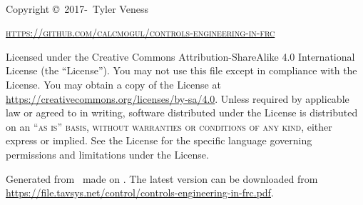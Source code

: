 ~\vfill
\thispagestyle{empty}

Copyright \copyright\ 2017-\unskip~Tyler Veness

\textsc{\url{https://github.com/calcmogul/controls-engineering-in-frc}}

Licensed under the Creative Commons Attribution-ShareAlike 4.0 International
License (the ``License''). You may not use this file except in compliance with
the License. You may obtain a copy of the License at
\url{https://creativecommons.org/licenses/by-sa/4.0}. Unless required by
applicable law or agreed to in writing, software distributed under the License
is distributed on an \textsc{``as is'' basis, without warranties or conditions
of any kind}, either express or implied. See the License for the specific
language governing permissions and limitations under the License.

Generated from \unskip~made on
\unskip. The latest version can be downloaded from
\url{https://file.tavsys.net/control/controls-engineering-in-frc.pdf}.

